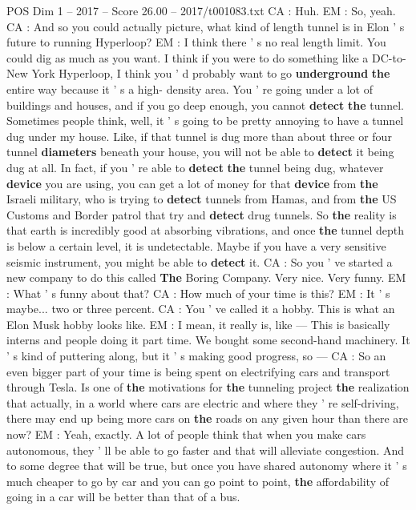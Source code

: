 \begin{textsample}{POS Dim 1 – 2017 – Score 26.00 – 2017/t001083.txt}
CA : Huh.
EM : So, yeah.
CA : And so you could actually picture, what kind of length tunnel is in Elon ' s future to running Hyperloop?
EM : I think there ' s no real length limit.
You could dig as much as you want.
I think if you were to do something like a DC-to-New York Hyperloop, I think you ' d probably want to go \textbf{underground} \textbf{the} entire way because it ' s a high- density area.
You ' re going under a lot of buildings and houses, and if you go deep enough, you cannot \textbf{detect} \textbf{the} tunnel.
Sometimes people think, well, it ' s going to be pretty annoying to have a tunnel dug under my house.
Like, if that tunnel is dug more than about three or four tunnel \textbf{diameters} beneath your house, you will not be able to \textbf{detect} it being dug at all.
In fact, if you ' re able to \textbf{detect} \textbf{the} tunnel being dug, whatever \textbf{device} you are using, you can get a lot of money for that \textbf{device} from \textbf{the} Israeli military, who is trying to \textbf{detect} tunnels from Hamas, and from \textbf{the} US Customs and Border patrol that try and \textbf{detect} drug tunnels.
So \textbf{the} reality is that earth is incredibly good at absorbing vibrations, and once \textbf{the} tunnel depth is below a certain level, it is undetectable.
Maybe if you have a very sensitive seismic instrument, you might be able to \textbf{detect} it.
CA : So you ' ve started a new company to do this called \textbf{The} Boring Company.
Very nice.
Very funny.
EM : What ' s funny about that?
CA : How much of your time is this?
EM : It ' s maybe... two or three percent.
CA : You ' ve called it a hobby.
This is what an Elon Musk hobby looks like.
EM : I mean, it really is, like — This is basically interns and people doing it part time.
We bought some second-hand machinery.
It ' s kind of puttering along, but it ' s making good progress, so — CA : So an even bigger part of your time is being spent on electrifying cars and transport through Tesla.
Is one of \textbf{the} motivations for \textbf{the} tunneling project \textbf{the} realization that actually, in a world where cars are electric and where they ' re self-driving, there may end up being more cars on \textbf{the} roads on any given hour than there are now?
EM : Yeah, exactly.
A lot of people think that when you make cars autonomous, they ' ll be able to go faster and that will alleviate congestion.
And to some degree that will be true, but once you have shared autonomy where it ' s much cheaper to go by car and you can go point to point, \textbf{the} affordability of going in a car will be better than that of a bus.

\end{textsample}
